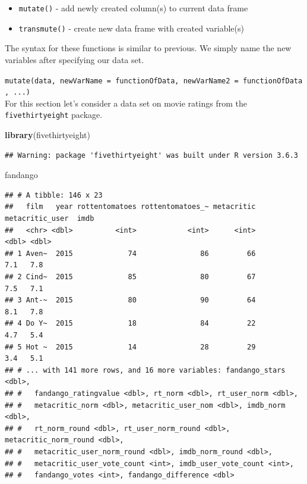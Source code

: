 \documentclass[
]{book}
\newenvironment{Shaded}{\begin{snugshade}}{\end{snugshade}}
\newcommand{\KeywordTok}[1]{\textcolor[rgb]{0.13,0.29,0.53}{\textbf{#1}}}
\newcommand{\NormalTok}[1]{#1}
\theoremstyle{definition}
\theoremstyle{definition}
\theoremstyle{definition}
\theoremstyle{remark}
\begin{document}
\begin{itemize}
\item
  \texttt{mutate()} - add newly created column(s) to current data frame
\item
  \texttt{transmute()} - create new data frame with created variable(s)
\end{itemize}

The syntax for these functions is similar to previous. We simply name the new variables after specifying our data set.

\texttt{mutate(data,\ newVarName\ =\ functionOfData,\ newVarName2\ =\ functionOfData,\ ...)}\\
For this section let's consider a data set on movie ratings from the \texttt{fivethirtyeight} package.

\begin{Shaded}
\begin{Highlighting}[]
\KeywordTok{library}\NormalTok{(fivethirtyeight)}
\end{Highlighting}
\end{Shaded}

\begin{verbatim}
## Warning: package 'fivethirtyeight' was built under R version 3.6.3
\end{verbatim}

\begin{Shaded}
\begin{Highlighting}[]
\NormalTok{fandango}
\end{Highlighting}
\end{Shaded}

\begin{verbatim}
## # A tibble: 146 x 23
##   film   year rottentomatoes rottentomatoes_~ metacritic metacritic_user  imdb
##   <chr> <dbl>          <int>            <int>      <int>           <dbl> <dbl>
## 1 Aven~  2015             74               86         66             7.1   7.8
## 2 Cind~  2015             85               80         67             7.5   7.1
## 3 Ant-~  2015             80               90         64             8.1   7.8
## 4 Do Y~  2015             18               84         22             4.7   5.4
## 5 Hot ~  2015             14               28         29             3.4   5.1
## # ... with 141 more rows, and 16 more variables: fandango_stars <dbl>,
## #   fandango_ratingvalue <dbl>, rt_norm <dbl>, rt_user_norm <dbl>,
## #   metacritic_norm <dbl>, metacritic_user_nom <dbl>, imdb_norm <dbl>,
## #   rt_norm_round <dbl>, rt_user_norm_round <dbl>, metacritic_norm_round <dbl>,
## #   metacritic_user_norm_round <dbl>, imdb_norm_round <dbl>,
## #   metacritic_user_vote_count <int>, imdb_user_vote_count <int>,
## #   fandango_votes <int>, fandango_difference <dbl>
\end{verbatim}
\end{document}

